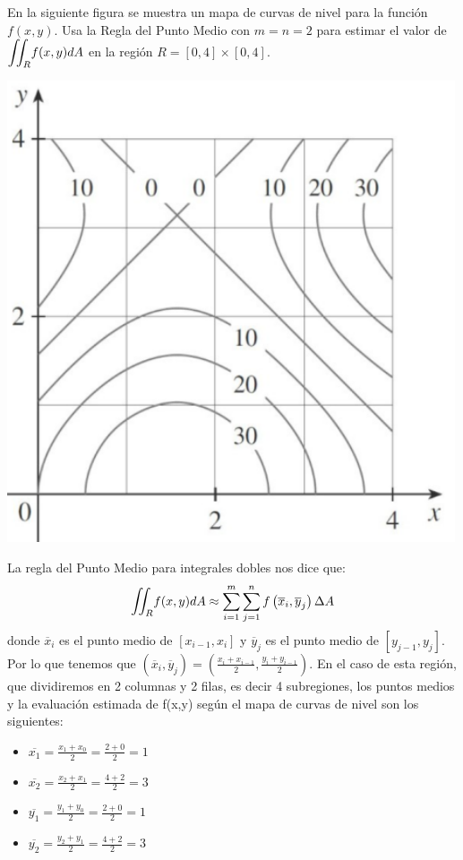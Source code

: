 \documentclass[12pt]{exam}
\begin{document}
\begin{questions}
    \question
     En la siguiente figura se muestra un mapa de curvas de nivel para la función $f(x,y)$. Usa la Regla del Punto Medio con $m=n=2$ para estimar el valor de $\mathlarger{\iint}_Rf(x,y)dA$ en la región $R=[0,4]\times[0,4]$. 
     \begin{center}
         \includegraphics[scale=.35 ]{img/i1e2.png}
     \end{center}

 La regla del Punto Medio para integrales dobles nos dice que: $$ \mathlarger{\iint}_Rf(x,y)dA \approx \sum_{i=1}^{m} \sum_{j=1}^{n} f\left(\overline{x}_i, \overline{y}_j\right) \Delta A$$
 donde \( \overline{x}_i \) es el punto medio de \([x_{i-1}, x_i]\) y \( \overline{y}_j \) es el punto medio de \([y_{j-1}, y_j]\).
 Por lo que tenemos que $\left(\overline{x}_i, \overline{y}_j\right) = \left(\frac{x_i+x_{i-1}}{2}, \frac{y_i+y_{i-1}}{2} \right)$. En el caso de esta región, que dividiremos en 2 columnas y 2 filas, es decir 4 subregiones, los puntos medios y la evaluación estimada de f(x,y) según el mapa de curvas de nivel   son los siguientes: \\
\begin{multicols}{3}
 \begin{itemize}
 \item $ \overline{x_1} = \frac{x_1 + x_0 }{2} = \frac{2+0}{2} = 1 $ \\
 \item $ \overline{x_2} = \frac{x_2 + x_{1} }{2}  = \frac{4+2}{2} = 3$  \\
 \item $ \overline{y_1} = \frac{y_1 + y_0}{2} = \frac{2+0}{2} = 1 $ \\
 \item $ \overline{y_2} = \frac{y_2 + y_1}{2} = \frac{4+2}{2} = 3$
 \end{itemize}


\end{multicols}
\end{questions}
\end{document}
